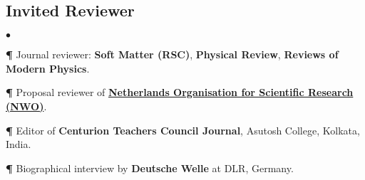 \documentclass[margin,line]{res}
\newenvironment{list2}{
  \begin{list}{$\bullet$}{%
      \setlength{\itemsep}{0in}
      \setlength{\parsep}{0in} \setlength{\parskip}{0in}
      \setlength{\topsep}{0in} \setlength{\partopsep}{0in} 
      \setlength{\leftmargin}{0.2in}}}{\end{list}}
\begin{document}
\begin{resume}
\section{\sc Invited Reviewer}
\begin{list2}
\item[{\bf \P}] Journal reviewer: {\bf Soft Matter (RSC)}, {\bf Physical Review}, {\bf Reviews of Modern Physics}. 
\item[{\bf \P}] Proposal reviewer of {\bf \href{https://www.nwo.nl/en}{Netherlands Organisation for Scientific Research (NWO)}}. 
\item[{\bf \P}] Editor of {\bf Centurion Teachers Council Journal}, Asutosh College, Kolkata, India.
\item[{\bf \P}] Biographical interview by {\bf \textsf{Deutsche Welle}} at DLR, Germany. 
\end{list2}


\end{resume}
\end{document}
